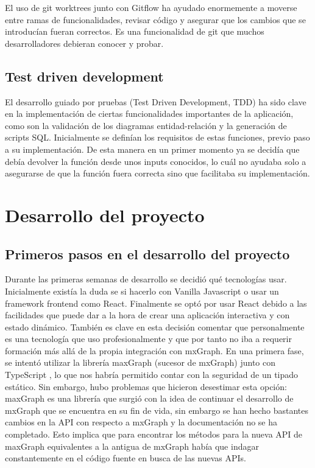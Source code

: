 El uso de git worktrees junto con Gitflow ha ayudado enormemente a moverse entre ramas de funcionalidades, revisar código y asegurar que los cambios que se introducían fueran correctos. Es una funcionalidad de git que muchos desarrolladores debieran conocer y probar.


\subsection{Test driven development}
El desarrollo guiado por pruebas (Test Driven Development, TDD) \cite{wiki:tdd} ha sido clave en la implementación de ciertas funcionalidades importantes de la aplicación, como son la validación de los diagramas entidad-relación y la generación de scripts SQL.
Inicialmente se definían los requisitos de estas funciones, previo paso a su implementación. De esta manera en un primer momento ya se decidía que debía devolver la función desde unos inputs conocidos, lo cuál no ayudaba solo a asegurarse de que la función fuera correcta sino que facilitaba su implementación.

\section{Desarrollo del proyecto}
\subsection{Primeros pasos en el desarrollo del proyecto}
Durante las primeras semanas de desarrollo se decidió qué tecnologías usar. Inicialmente existía la duda se si hacerlo con Vanilla Javascript o usar un framework frontend como React. Finalmente se optó por usar React debido a las facilidades que puede dar a la hora de crear una aplicación interactiva y con estado dinámico. También es clave en esta decisión comentar que personalmente es una tecnología que uso profesionalmente y que por tanto no iba a requerir formación más allá de la propia integración con mxGraph.
En una primera fase, se intentó utilizar la librería maxGraph \cite{maxgraph} (sucesor de mxGraph) junto con TypeScript 
\cite{typescript}, lo que nos habría permitido contar con la seguridad de un tipado estático. Sin embargo, hubo problemas que hicieron desestimar esta opción: maxGraph es una librería que surgió con la idea de continuar el desarrollo de mxGraph que se encuentra en su fin de vida, sin embargo se han hecho bastantes cambios en la API con respecto a mxGraph y la documentación no se ha completado. Esto implica que para encontrar los métodos para la nueva API de maxGraph equivalentes a la antigua de mxGraph había que indagar constantemente en el código fuente en busca de las nuevas APIs.

